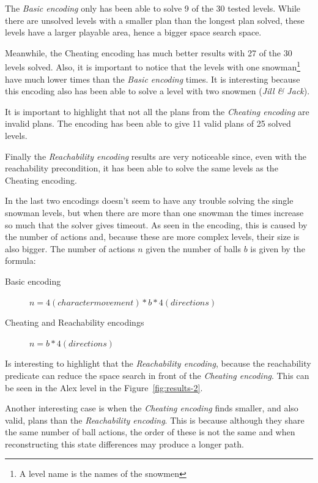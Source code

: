 \documentclass{report}
\theoremstyle{plain}
\begin{document}
The \emph{Basic encoding} only has been able to solve 9 of the 30 tested levels. While there are unsolved levels with a smaller plan than the longest plan solved, these levels have a larger playable area, hence a bigger space search space.

Meanwhile, the Cheating encoding has much better results with 27 of the 30 levels solved. Also, it is important to notice that the levels with one snowman\footnote{A level name is the names of the snowmen} have much lower times than the \emph{Basic encoding} times. It is interesting because this encoding also has been able to solve a level with two snowmen (\emph{Jill \& Jack}).

It is important to highlight that not all the plans from the \emph{Cheating encoding} are invalid plans. The encoding has been able to give 11 valid plans of 25 solved levels.     

Finally the \emph{Reachability encoding} results are very noticeable since, even with the reachability precondition, it has been able to solve the same levels as the Cheating encoding.

In the last two  encodings doesn't seem to have any trouble solving the single snowman levels, but when there are more than one snowman the times increase so much that the solver gives timeout. As seen in the encoding, this is caused by the number of actions and, because these are more complex levels, their size is also  bigger. The number of actions $n$ given the number of balls $b$ is given by the formula:
\begin{description}
    \item[Basic encoding] $n = 4 (character movement) * b * 4 (directions)$
    \item[Cheating and Reachability encodings] $n = b * 4 (directions)$
\end{description}

\vspace{1\baselineskip}

Is interesting to highlight that the \emph{Reachability encoding}, because the reachability predicate can reduce the space search in front of the \emph{Cheating encoding}. This can be seen in the Alex level in the Figure~\ref{fig:results-2}.

Another interesting case is when the \emph{Cheating encoding} finds smaller, and also valid, plans than the \emph{Reachability encoding}. This is because although they share the same number of ball actions, the order of these is not the same and when reconstructing this state differences may produce a longer path.
\end{document}
